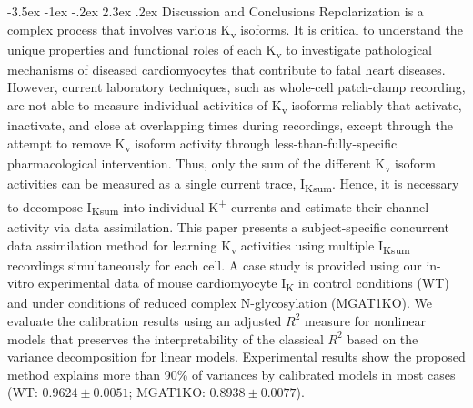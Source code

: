 \documentclass[11pt]{article}
\makeatletter
\renewcommand\section{\@startsection {section}{1}{\z@}%
                                   {-3.5ex \@plus -1ex \@minus -.2ex}%
                                   {2.3ex \@plus.2ex}%
                                   {\normalfont\fontfamily{phv}\fontsize{16}{19}\bfseries}}
\providecommand{\DIFaddbegin}{} %
\newcommand{\DIFaddincludegraphics}[2][]{{\color{blue}\fbox{\DIFOincludegraphics[#1]{#2}}}} %
\DeclareRobustCommand{\DIFaddbegin}{\DIFOaddbegin \let\includegraphics\DIFaddincludegraphics} %
\makeatother
\begin{document}
\section{Discussion and Conclusions}
Repolarization is a complex process that involves various K\textsubscript{v} isoforms. It is critical to understand the unique properties and functional roles of each K\textsubscript{v} to investigate pathological mechanisms of diseased cardiomyocytes that contribute to fatal heart diseases. However, current laboratory techniques, such as whole-cell patch-clamp recording, are not able to measure individual activities of K\textsubscript{v} isoforms reliably that activate, inactivate, and close at overlapping times during recordings, except through the attempt to remove K\textsubscript{v} isoform activity through less-than-fully-specific pharmacological intervention. Thus, only the sum of the different K\textsubscript{v} isoform activities can be measured as a single current trace, I\textsubscript{Ksum}. Hence, it is necessary to decompose I\textsubscript{Ksum} into individual K\textsuperscript{+} currents and estimate their channel activity via data assimilation. This paper presents a subject-specific concurrent data assimilation method for learning K\textsubscript{v} activities using multiple I\textsubscript{Ksum} recordings simultaneously for each cell. A case study is provided using our in-vitro experimental data of mouse cardiomyocyte I\textsubscript{K} in control conditions (WT) and under conditions of reduced complex N-glycosylation (MGAT1KO). We evaluate the calibration results using an adjusted $R^2$ measure for nonlinear models that preserves the interpretability of the classical $R^2$ based on the variance decomposition for linear models. Experimental results show the proposed method explains more than 90\% of variances by calibrated models in most cases (WT: $0.9624 \pm 0.0051$; MGAT1KO: $0.8938 \pm 0.0077$). 
\DIFaddbegin 
\end{document}
